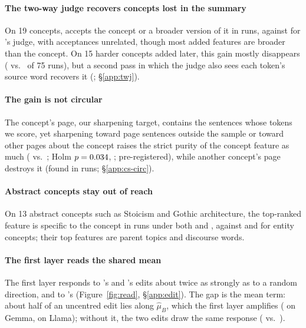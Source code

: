 \paragraph{The two-way judge recovers concepts lost in the summary}
On 19 concepts, \twj{} accepts the concept or a broader version of it in  runs, against  for \ember{}'s judge, with  acceptances unrelated, though most added features are broader than the concept.
On 15 harder concepts added later, this gain mostly disappears ( vs.\  of 75 runs), but a second pass in which the judge also sees each token's source word recovers it (; \S\ref{app:twj}).

\paragraph{The gain is not circular}
The concept's page, our sharpening target, contains the sentences whose tokens we score, yet sharpening toward page sentences outside the sample or toward other pages about the concept raises the strict purity of the concept feature as much ( vs.\ ; Holm $p = 0.034$, ; pre-registered), while another concept's page destroys it (found in  runs; \S\ref{app:cs-circ}).

\paragraph{Abstract concepts stay out of reach}
On 13 abstract concepts such as Stoicism and Gothic architecture, the top-ranked feature is specific to the concept in  runs under both \ember{} and \cs{}, against  and  for entity concepts; their top features are parent topics and discourse words.

\paragraph{The first layer reads the shared mean}
The first layer responds to \ember{}'s and \cinderz{}'s edits about twice as strongly as to a random direction, and to \cinder{}'s  (Figure~\ref{fig:read}, \S\ref{app:edit}).
The gap is the mean term: about half of an uncentred edit lies along $\hat\mu_B$, which the first layer amplifies ( on Gemma,  on Llama); without it, the two edits draw the same response ( vs.\ ).
